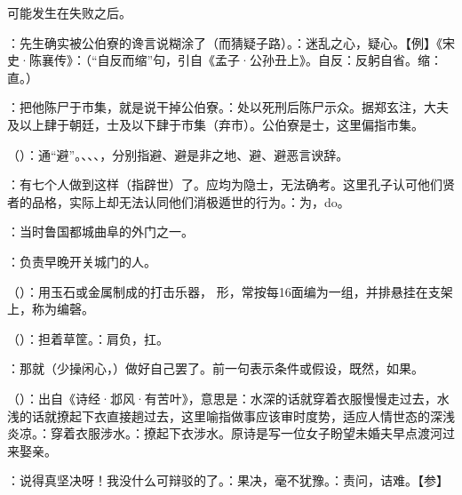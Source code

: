 {
\item {}可能发生在失败之后。
\item {}：先生确实被公伯寮的谗言说糊涂了（而猜疑子路）。：迷乱之心，疑心。【例】《宋史·陈襄传》：（“自反而缩”句，引自《孟子·公孙丑上》。自反：反躬自省。缩：直。）
\item {}：把他陈尸于市集，就是说干掉公伯寮。：处以死刑后陈尸示众。据郑玄注，大夫及以上肆于朝廷，士及以下肆于市集（弃市）。公伯寮是士，这里偏指市集。
}
{}


{
\item {}（）：通“避”。、、、，分别指避、避是非之地、避、避恶言谀辞。%
\item {}：有七个人做到这样（指辟世）了。应均为隐士，无法确考。这里孔子认可他们贤者的品格，实际上却无法认同他们消极遁世的行为。：为，do。
}
{}


{
\item {}：当时鲁国都城曲阜的外门之一。
\item {}：负责早晚开关城门的人。
}
{}


{
\item {}（）：用玉石或金属制成的打击乐器， 形，常按每16面编为一组，并排悬挂在支架上，称为编磬。
\item {}（）：担着草筐。：肩负，扛。
\item {}：那就（少操闲心，）做好自己罢了。前一句表示条件或假设，既然，如果。
\item {}（）：出自《诗经·邶风·有苦叶》，意思是：水深的话就穿着衣服慢慢走过去，水浅的话就撩起下衣直接趟过去，这里喻指做事应该审时度势，适应人情世态的深浅炎凉。：穿着衣服涉水。：撩起下衣涉水。原诗是写一位女子盼望未婚夫早点渡河过来娶亲。
\item {}：说得真坚决呀！我没什么可辩驳的了。：果决，毫不犹豫。：责问，诘难。【参】
}
{}  %


